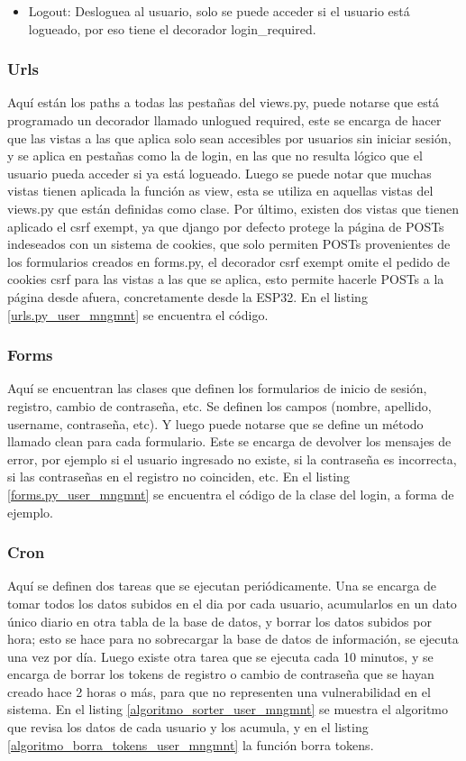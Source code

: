 \begin{itemize}
    \item Logout: Desloguea al usuario, solo se puede acceder si el usuario está logueado, por eso tiene el decorador login\_required. 
    
\end{itemize}

\subsubsection{Urls}
Aquí están los paths a todas las pestañas del views.py, puede notarse que está programado un decorador llamado unlogued required, este se encarga de hacer que las vistas a las que aplica solo sean accesibles por usuarios sin iniciar sesión, y se aplica en pestañas como la de login, en las que no resulta lógico que el usuario pueda acceder si ya está logueado. Luego se puede notar que muchas vistas tienen aplicada la función as view, esta se utiliza en aquellas vistas del views.py que están definidas como clase. Por último, existen dos vistas que tienen aplicado el csrf exempt, ya que django por defecto protege la página de POSTs indeseados con un sistema de cookies, que solo permiten POSTs provenientes de los formularios creados en forms.py, el decorador csrf exempt omite el pedido de cookies csrf para las vistas a las que se aplica, esto permite hacerle POSTs a la página desde afuera, concretamente desde la ESP32. En el listing \ref{urls.py_user_mngmnt} se encuentra el código.

\subsubsection{Forms}

Aquí se encuentran las clases que definen los formularios de inicio de sesión, registro, cambio de contraseña, etc. Se definen los campos (nombre, apellido, username, contraseña, etc). Y luego puede notarse que se define un método llamado clean para cada formulario. Este se encarga de devolver los mensajes de error, por ejemplo si el usuario ingresado no existe, si la contraseña es incorrecta, si las contraseñas en el registro no coinciden, etc. En el listing \ref{forms.py_user_mngmnt} se encuentra el código de la clase del login, a forma de ejemplo.

\subsubsection{Cron}

Aquí se definen dos tareas que se ejecutan periódicamente. Una se encarga de tomar todos los datos subidos en el dia por cada usuario, acumularlos en un dato único diario en otra tabla de la base de datos, y borrar los datos subidos por hora; esto se hace para no sobrecargar la base de datos de información, se ejecuta una vez por día. Luego existe otra tarea que se ejecuta cada 10 minutos, y se encarga de borrar los tokens de registro o cambio de contraseña que se hayan creado hace 2 horas o más, para que no representen una vulnerabilidad en el sistema. En el listing \ref{algoritmo_sorter_user_mngmnt} se muestra el algoritmo que revisa los datos de cada usuario y los acumula, y en el listing \ref{algoritmo_borra_tokens_user_mngmnt} la función borra tokens.


